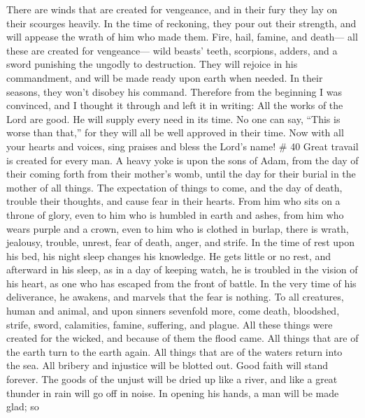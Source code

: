  There are winds that are created for vengeance, and in
their fury they lay on their scourges heavily. In the time of reckoning,
they pour out their strength, and will appease the wrath of him who made
them.  Fire, hail, famine, and death--- all these are
created for vengeance---  wild beasts' teeth, scorpions,
adders, and a sword punishing the ungodly to destruction. 
They will rejoice in his commandment, and will be made ready upon earth
when needed. In their seasons, they won't disobey his command.
 Therefore from the beginning I was convinced, and I
thought it through and left it in writing:  All the works
of the Lord are good. He will supply every need in its time.
 No one can say, ``This is worse than that,'' for they will
all be well approved in their time.  Now with all your
hearts and voices, sing praises and bless the Lord's name! \# 40
 Great travail is created for every man. A heavy yoke is
upon the sons of Adam, from the day of their coming forth from their
mother's womb, until the day for their burial in the mother of all
things.  The expectation of things to come, and the day of
death, trouble their thoughts, and cause fear in their hearts.
 From him who sits on a throne of glory, even to him who is
humbled in earth and ashes,  from him who wears purple and a
crown, even to him who is clothed in burlap,  there is
wrath, jealousy, trouble, unrest, fear of death, anger, and strife. In
the time of rest upon his bed, his night sleep changes his knowledge.
 He gets little or no rest, and afterward in his sleep, as
in a day of keeping watch, he is troubled in the vision of his heart, as
one who has escaped from the front of battle.  In the very
time of his deliverance, he awakens, and marvels that the fear is
nothing.  To all creatures, human and animal, and upon
sinners sevenfold more,  come death, bloodshed, strife,
sword, calamities, famine, suffering, and plague.  All
these things were created for the wicked, and because of them the flood
came.  All things that are of the earth turn to the earth
again. All things that are of the waters return into the sea.
 All bribery and injustice will be blotted out. Good faith
will stand forever.  The goods of the unjust will be dried
up like a river, and like a great thunder in rain will go off in noise.
 In opening his hands, a man will be made glad; so
